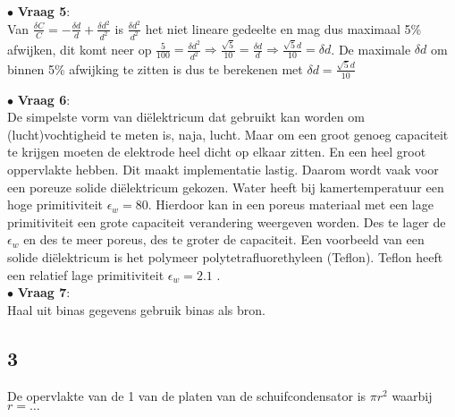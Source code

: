     \noindent
    $\bullet$ \textbf{Vraag 5}:\\

    Van $\frac{\delta C}{C}=-\frac{\delta d}{d}+\frac{\delta d^2}{d^2}$ is $\frac{\delta d^2}{d^2}$ het niet lineare gedeelte
    en mag dus maximaal 5\% afwijken, dit komt neer op $\frac{5}{100}=\frac{\delta d^2}{d^2}\Rightarrow\frac{\sqrt{5}}{10}=\frac{\delta d}{d}\Rightarrow \frac{\sqrt{5}d}{10}=\delta d$. De maximale 
    $\delta d$ om binnen 5\% afwijking te zitten is dus te berekenen met $\delta d=\frac{\sqrt{5}d}{10}$

    \noindent
    $\bullet$ \textbf{Vraag 6}:\\

    De simpelste vorm van diëlektricum dat gebruikt kan worden om (lucht)vochtigheid te meten is, naja, lucht. 
    Maar om een groot genoeg capaciteit te krijgen moeten de elektrode heel dicht op elkaar zitten. 
    En een heel groot oppervlakte hebben. Dit maakt implementatie lastig. Daarom wordt vaak voor een poreuze solide diëlektricum gekozen. 
    Water heeft bij kamertemperatuur een hoge primitiviteit $\epsilon_w=80$. 
    Hierdoor kan in een poreus materiaal met een lage primitiviteit een grote capaciteit verandering weergeven worden. 
    Des te lager de $\epsilon_w$ en des te meer poreus, des te groter de capaciteit. Een voorbeeld van een solide diëlektricum is het polymeer polytetrafluorethyleen (Teflon). 
    Teflon heeft een relatief lage primitiviteit $\epsilon_w=2.1$ .\\

    \noindent
    $\bullet$ \textbf{Vraag 7}:\\

    Haal uit binas gegevens gebruik binas als bron.

\subsection{3}
De opervlakte van de 1 van de platen van de schuifcondensator is 
$\pi r^2$ waarbij $r=\dots$